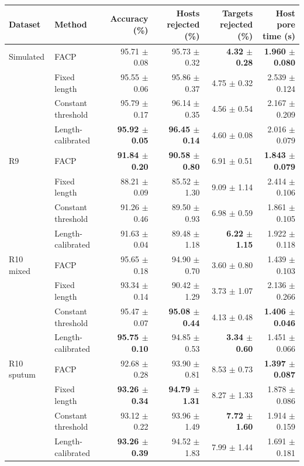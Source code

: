 \begin{tabular}{@{}llrrrr@{}}
\toprule
Dataset & Method & Accuracy (\%) & Hosts rejected (\%) & Targets rejected (\%) & Host pore time (s)\\\midrule
Simulated & FACP & 95.71 $\pm$ 0.08 & 95.73 $\pm$ 0.32 & \textbf{4.32 $\pm$ 0.28} & \textbf{1.960 $\pm$ 0.080}\\
 & Fixed length & 95.55 $\pm$ 0.06 & 95.86 $\pm$ 0.37 & 4.75 $\pm$ 0.32 & 2.539 $\pm$ 0.124\\
 & Constant threshold & 95.79 $\pm$ 0.17 & 96.14 $\pm$ 0.35 & 4.56 $\pm$ 0.54 & 2.167 $\pm$ 0.209\\
 & Length-calibrated & \textbf{95.92 $\pm$ 0.05} & \textbf{96.45 $\pm$ 0.14} & 4.60 $\pm$ 0.08 & 2.016 $\pm$ 0.079\\
\addlinespace
R9 & FACP & \textbf{91.84 $\pm$ 0.20} & \textbf{90.58 $\pm$ 0.80} & 6.91 $\pm$ 0.51 & \textbf{1.843 $\pm$ 0.079}\\
 & Fixed length & 88.21 $\pm$ 0.09 & 85.52 $\pm$ 1.30 & 9.09 $\pm$ 1.14 & 2.414 $\pm$ 0.106\\
 & Constant threshold & 91.26 $\pm$ 0.46 & 89.50 $\pm$ 0.93 & 6.98 $\pm$ 0.59 & 1.861 $\pm$ 0.105\\
 & Length-calibrated & 91.63 $\pm$ 0.04 & 89.48 $\pm$ 1.18 & \textbf{6.22 $\pm$ 1.15} & 1.922 $\pm$ 0.118\\
\addlinespace
R10 mixed & FACP & 95.65 $\pm$ 0.18 & 94.90 $\pm$ 0.70 & 3.60 $\pm$ 0.80 & 1.439 $\pm$ 0.103\\
 & Fixed length & 93.34 $\pm$ 0.14 & 90.42 $\pm$ 1.29 & 3.73 $\pm$ 1.07 & 2.136 $\pm$ 0.266\\
 & Constant threshold & 95.47 $\pm$ 0.07 & \textbf{95.08 $\pm$ 0.44} & 4.13 $\pm$ 0.48 & \textbf{1.406 $\pm$ 0.046}\\
 & Length-calibrated & \textbf{95.75 $\pm$ 0.10} & 94.85 $\pm$ 0.53 & \textbf{3.34 $\pm$ 0.60} & 1.451 $\pm$ 0.066\\
\addlinespace
R10 sputum & FACP & 92.68 $\pm$ 0.28 & 93.90 $\pm$ 0.81 & 8.53 $\pm$ 0.73 & \textbf{1.397 $\pm$ 0.087}\\
 & Fixed length & \textbf{93.26 $\pm$ 0.34} & \textbf{94.79 $\pm$ 1.31} & 8.27 $\pm$ 1.33 & 1.878 $\pm$ 0.086\\
 & Constant threshold & 93.12 $\pm$ 0.22 & 93.96 $\pm$ 1.49 & \textbf{7.72 $\pm$ 1.60} & 1.914 $\pm$ 0.159\\
 & Length-calibrated & \textbf{93.26 $\pm$ 0.39} & 94.52 $\pm$ 1.83 & 7.99 $\pm$ 1.44 & 1.691 $\pm$ 0.181\\
\bottomrule
\end{tabular}

